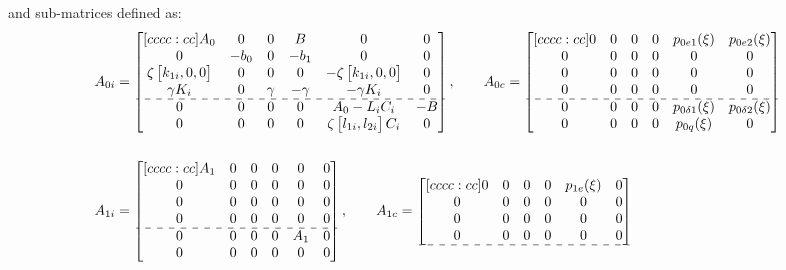 \documentclass[../main.tex]{subfiles}
\begin{document}
	and sub-matrices defined as:
	\begin{align}
		A_{0i} &= 
		\begin{bmatrix}[cccc:cc]
		A_0 & 0 & 0 & B & 0 & 0\\
		0 & -b_0 & 0 & -b_1 & 0 & 0\\
		\zeta \begin{bmatrix}k_{1i} , 0 , 0\end{bmatrix} & 0 & 0 & 0 & -\zeta\begin{bmatrix}k_{1i} , 0 , 0\end{bmatrix} & 0\\
		\gamma K_i & 0 & \gamma & -\gamma & -\gamma K_i & 0\\ \hdashline
		0 & 0 & 0 & 0 & A_0 - L_iC_i & -B\\ 
		0 & 0 & 0 & 0 & \zeta \begin{bmatrix}l_{1i} , l_{2i}	\end{bmatrix} C_i & 0
		\end{bmatrix}, \qquad
		A_{0c} = 
		\begin{bmatrix}[cccc:cc]
		0 & 0 & 0 & 0 & p_{0e1}(\xi) & p_{0e2}(\xi) \\
		0 & 0 & 0 & 0 & 0 & 0 \\
		0 & 0 & 0 & 0 & 0 & 0 \\
		0 & 0 & 0 & 0 & 0 & 0 \\ \hdashline
		0 & 0 & 0 & 0 & p_{0\delta 1}(\xi) & p_{0\delta 2}(\xi) \\
		0 & 0 & 0 & 0 & p_{0q}(\xi) & 0
		\end{bmatrix} \nonumber\\
		\nonumber\\
		A_{1i} &= 
		\begin{bmatrix}[cccc:cc]
		A_1 & 0 & 0 & 0 & 0 & 0\\
		0 & 0 & 0 & 0 & 0 & 0\\
		0 & 0 & 0 & 0 & 0 & 0\\
		0 & 0 & 0 & 0 & 0 & 0\\ \hdashline
		0 & 0 & 0 & 0 & A_1 & 0\\ 
		0 & 0 & 0 & 0 & 0 & 0
		\end{bmatrix}, \qquad
		A_{1c} = \begin{bmatrix}[cccc:cc]	
		0 & 0 & 0 & 0 & p_{1e}(\xi) & 0\\
		0 & 0 & 0 & 0 & 0 & 0\\
		0 & 0 & 0 & 0 & 0 & 0\\
		0 & 0 & 0 & 0 & 0 & 0\\ \hdashline

\end{bmatrix}
\end{align}
\end{document}
